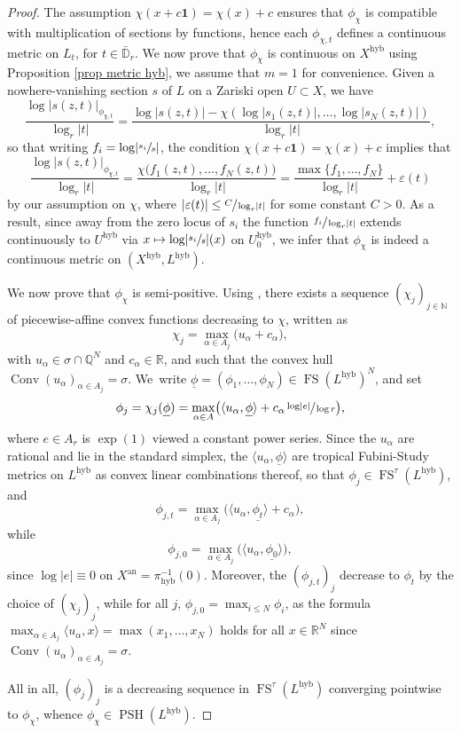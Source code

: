 \documentclass[JEP,XML,SOM,Unicode,published]{cedram}
\newcommand\mto{\mathchoice{\longmapsto}{\mapsto}{\mapsto}{\mapsto}}
\theoremstyle{definition}
\newcommand \D {\mathbb{D}}
\newcommand \N{\mathbb N}
\newcommand \Q{\mathbb Q}
\newcommand \R{\mathbb R}
\let\eps\varepsilon
\newcommand{\an}{\mathrm{an}}
\DeclareMathOperator{\Conv}{Conv}
\DeclareMathOperator{\FS}{FS}
\newcommand{\hyb}{\mathrm{hyb}}
\DeclareMathOperator{\PSH}{PSH}
\begin{document}
\begin{proof}
The assumption $\chi(x +c \mathbf{1}) = \chi(x) +c$ ensures that $\phi_{\chi}$ is compatible with multiplication of sections by functions, hence each $\phi_{\chi, t}$ defines a continuous metric on $L_t$, for $t \in \bar{\D}_r$. We now prove that $\phi_{\chi}$ is continuous on $X^{\hyb}$ using Proposition \ref{prop metric hyb}, we assume that $m=1$ for convenience. Given a nowhere-vanishing section $s$ of $L$ on a Zariski open $U \subset X$, we have
\[
\frac{ \log \lvert s(z,t) \rvert_{\phi_{\chi, t}}}{\log_r \lvert t \rvert} = \frac{ \log \lvert s(z,t) \rvert - \chi(\log \lvert s_1(z,t) \rvert,\dots, \log \lvert s_N(z,t) \rvert)}{\log_r \lvert t \rvert},
\]
so that writing $f_i = \log \lvert \sfrac{s_i}{s} \rvert$, the condition $\chi(x +c \mathbf{1}) = \chi(x) +c$ implies that
\[
\frac{ \log \lvert s(z,t) \rvert_{\phi_{\chi, t}}}{\log_r \lvert t \rvert} = \frac{ \chi\bigl(f_1(z,t),\dots,f_N(z,t)\bigr)}{\log_r \lvert t \rvert} = \frac{\max \{ f_1,\dots, f_N \}}{\log_r \lvert t \rvert} + \eps(t)
\]
by our assumption on $\chi$, where $\lvert \eps(t) \rvert \le \sfrac{C}{\log_r \lvert t \rvert}$ for some constant $C>0$. As a result, since away from the zero locus of $s_i$ the function $\sfrac{f_i}{\log_r \lvert t \rvert}$ extends continuously to $U^{\hyb}$ via $x \mto \log \lvert \sfrac{s_i}{s} \rvert (x)$ on $U^{\hyb}_0$, we infer that $\phi_{\chi}$ is indeed a continuous metric on $(X^{\hyb}, L^{\hyb})$.

We now prove that $\phi_{\chi}$ is semi-positive. Using \cite[Prop.\,2.6]{PS22}, there exists a sequence $(\chi_j)_{j \in \N}$ of piecewise-affine convex functions decreasing to $\chi$, written as
\[
\chi_j = \max_{\alpha \in A_j} \bigl(u_{\alpha} + c_{\alpha}\bigr),
\]
with $u_{\alpha} \in \sigma \cap \Q^N$ and $c_{\alpha} \in \R$, and such that the convex hull $\Conv(u_{\alpha})_{\alpha \in A_j} = \sigma$. We~write $\underline{\phi} = (\phi_1,\dots, \phi_N) \in \FS(L^{\hyb})^N$, and set
\[
\phi_j = \chi_j(\underline\phi)= \max_{\alpha \in A} \bigl(\langle u_{\alpha}, \underline\phi \rangle + c_{\alpha} \sfrac{ \log \lvert e \rvert}{\log r}\bigr),
\]
where $e \in A_r$ is $\exp(1)$ viewed a constant power series. Since the $u_{\alpha}$ are rational and lie in the standard simplex, the $ \langle u_{\alpha}, \underline\phi \rangle$ are tropical Fubini-Study metrics on $L^{\hyb}$ as convex linear combinations thereof, so that $\phi_j \in \FS^{\tau}(L^{\hyb})$, and
\[
\phi_{j, t} = \max_{\alpha \in A_j} \bigl(\langle u_{\alpha}, \underline{\phi_t} \rangle + c_{\alpha} \bigr),
\]
while
\[
\phi_{j, 0} = \max_{\alpha \in A_j} \bigl(\langle u_{\alpha}, \underline{\phi_0} \rangle \bigr),
\]
since $\log \lvert e \rvert \equiv 0$ on $X^{\an} = \pi_{\hyb}^{-1}(0)$.
Moreover, the $(\phi_{j,t})_j$ decrease to $\phi_t$ by the choice of $(\chi_j)_j$, while for all $j$, $\phi_{j, 0} = \max_{i \le N} \phi_i$, as the formula $\max_{\alpha \in A_j} \langle u_{\alpha} , x \rangle = \max (x_1,\dots,x_N)$ holds for all $x \in \R^N$ since $\Conv(u_{\alpha})_{\alpha \in A_j} = \sigma$.

All in all, $(\phi_j)_j$ is a decreasing sequence in $\FS^{\tau}(L^{\hyb})$ converging pointwise to $\phi_{\chi}$, whence $\phi_{\chi} \in \PSH(L^{\hyb})$.
\end{proof}
\end{document}
